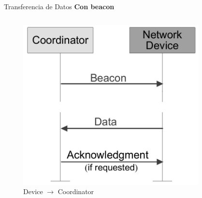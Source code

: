\documentclass[aspectratio=169]{beamer}
\begin{document}
\begin{frame}[t]{Transferencia de Datos}
\textbf{Con beacon}
\begin{columns}[t]
	\begin{column}{.5\textwidth}
		\begin{minipage}[t][0.7\textheight][s]{\columnwidth}
			\begin{figure}[H]
				\includegraphics[height=.65\textheight]{./imagenes/dev-coord-beacon.jpg}
				\vfill
				\vspace{10px}
				\caption{Device $\rightarrow$ Coordinator}
			\end{figure}
		\end{minipage}
	\end{column}
	\begin{column}{.5\textwidth}
		\begin{minipage}[t][0.7\textheight][s]{\columnwidth}
			\begin{figure}[H]

\end{figure}
\end{minipage}
\end{column}
\end{columns}
\end{frame}
\end{document}
